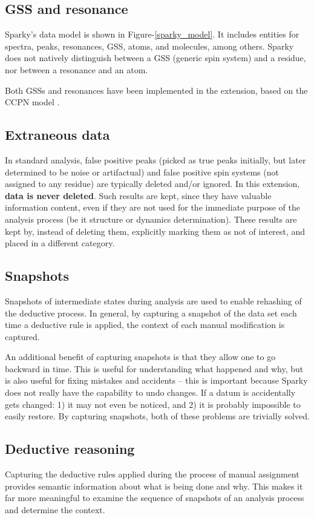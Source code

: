 \subsection{GSS and resonance}
Sparky's data model is shown in Figure-\ref{sparky_model}.  It includes 
entities for spectra, peaks, resonances, GSS, atoms, and molecules, among
others.  Sparky does not natively distinguish between a GSS (generic spin 
system) and a residue, nor between a resonance and an atom.

Both GSSs and resonances have been implemented in the extension, based 
on the CCPN model \cite{ccpn}.

\subsection{Extraneous data}
In standard analysis, false positive peaks (picked as true peaks initially,
but later determined to be noise or artifactual) and false positive spin 
systems (not assigned to any residue) are typically deleted and/or ignored.
In this extension, \textbf{data is never deleted}.  Such results are kept,
since they have valuable information content, even if they are not used for
the immediate purpose of the analysis process (be it structure or dynamics
determination).  These results are kept by, instead of deleting them, 
explicitly marking them as not of interest, and placed in a different
category.

\subsection{Snapshots}
Snapshots of intermediate states during analysis are used to enable rehashing
of the deductive process.  In general, by capturing a snapshot of the data set
each time a deductive rule is applied, the context of each manual modification
is captured.

An additional benefit of capturing snapshots is that they allow one to go 
backward in time.  This is useful for understanding what happened and
why, but is also useful for fixing mistakes and accidents -- this is
important because Sparky does not really have the capability to undo
changes.  If a datum is accidentally gets changed: 1) it may not even
be noticed, and 2) it is probably impossible to easily restore.  By capturing
snapshots, both of these problems are trivially solved.

\subsection{Deductive reasoning}
Capturing the deductive rules applied during the process of manual assignment
provides semantic information about what is being done and why.  This makes it
far more meaningful to examine the sequence of snapshots of an analysis
process and determine the context.

